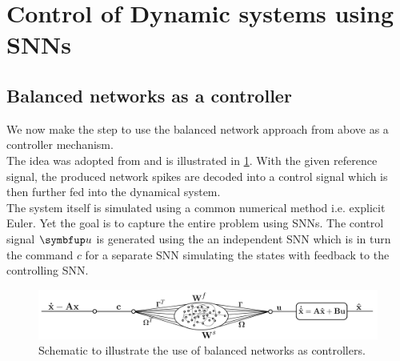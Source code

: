 \section{Control of Dynamic systems using \acp{SNN}}\label{sec:control}
\subsection{Balanced networks as a controller}
We now make the step to use the balanced network approach from above as a controller mechanism.\\
The idea was adopted from \cite{huang_optimizing_2017} and is illustrated in \cref{fig:schematic}. With the given reference signal, the produced network spikes are decoded into a control signal which is then further fed into the dynamical system.\\
The system itself is simulated using a common numerical method i.e. explicit Euler. Yet the goal is to capture the entire problem using \acp{SNN}. The control signal $\bmu{u}$ is generated using the an independent \ac{SNN} which is in turn the command $c$ for a separate \ac{SNN} simulating the states with feedback to the controlling \ac{SNN}.
\begin{figure}
	\centering
	\includegraphics[width=\textwidth]{svg-inkscape/schematic_controller_network.pdf}
	\caption{Schematic to illustrate the use of balanced networks as controllers.}
	\label{fig:schematic}
\end{figure}
